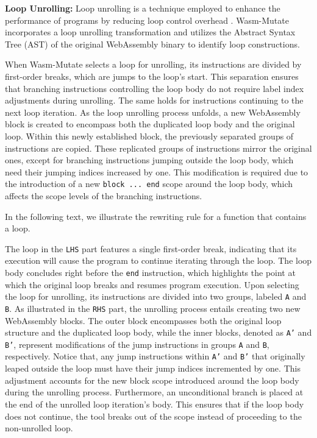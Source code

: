 \documentclass[a4paper,fleqn]{cas-dc}
\newcommand{\tool}{{\sc Wasm-Mutate}\xspace}
\begin{document}
\textbf{Loop Unrolling:} 
Loop unrolling is a technique employed to enhance the performance of programs by reducing loop control overhead \cite{dongarra1979unrolling}. 
\tool incorporates a loop unrolling transformation and utilizes the Abstract Syntax Tree (AST) of the original WebAssembly binary to identify loop constructions. 

When \tool selects a loop for unrolling, its instructions are divided by first-order breaks, which are jumps to the loop's start. This separation ensures that branching instructions controlling the loop body do not require label index adjustments during unrolling. The same holds for instructions continuing to the next loop iteration.
As the loop unrolling process unfolds, a new WebAssembly block is created to encompass both the duplicated loop body and the original loop. 
Within this newly established block, the previously separated groups of instructions are copied. 
These replicated groups of instructions mirror the original ones, except for branching instructions jumping outside the loop body, which need their jumping indices increased by one. This modification is required due to the introduction of a new \texttt{block ... end} scope around the loop body, which affects the scope levels of the branching instructions.

In the following text, we illustrate the rewriting rule for a function that contains a loop. 


The loop in the \texttt{LHS} part features a single first-order break, indicating that its execution will cause the program to continue iterating through the loop. 
The loop body concludes right before the \texttt{end} instruction, which highlights the point at which the original loop breaks and resumes program execution.
Upon selecting the loop for unrolling, its instructions are divided into two groups, labeled \texttt{A} and \texttt{B}. 
As illustrated in the \texttt{RHS} part, the unrolling process entails creating two new WebAssembly blocks. 
The outer block encompasses both the original loop structure and the duplicated loop body, while the inner blocks, denoted as \texttt{A'} and \texttt{B'}, represent modifications of the jump instructions in groups \texttt{A} and \texttt{B}, respectively.
Notice that, any jump instructions within \texttt{A'} and \texttt{B'} that originally leaped outside the loop must have their jump indices incremented by one. 
This adjustment accounts for the new block scope introduced around the loop body during the unrolling process. 
Furthermore, an unconditional branch is placed at the end of the unrolled loop iteration's body. 
This ensures that if the loop body does not continue, the tool breaks out of the scope instead of proceeding to the non-unrolled loop.
\end{document}
